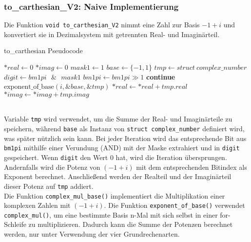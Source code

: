 \documentclass[course=erap]{aspdoc}
\begin{document}
\subsubsection{to\_carthesian\_V2: Naive Implementierung}
Die Funktion \texttt{void to\_carthesian\_V2} nimmt eine Zahl zur Basis $-1 + i$ und konvertiert sie in Dezimalsystem mit getrennten Real- und Imaginärteil.
\begin{algorithm}
\caption{to\_carthesian Pseudocode}
\begin{algorithmic}
    \State $*real \gets 0$
    \State $*imag \gets 0$
    \State $mask1 \gets 1$
    \State $base \gets \{-1, 1\}$
    \State $tmp \gets struct\ complex\_number$
        \State $digit \gets bm1pi \text{ } \&  \text{ }mask1$
        \State $bm1pi \gets bm1pi \gg 1$
            \State \textbf{continue}
        \EndIf
        \State $\text{exponent\_of\_base}(i, \&base, \&tmp)$
        \State $*real \gets *real + tmp.real$
        \State $*imag \gets *imag + tmp.imag$
    \EndFor
\end{algorithmic}
\end{algorithm}\\
Variable \texttt{tmp} wird verwendet, um die Summe der Real- und Imaginärteile zu speichern, während \texttt{base} als Instanz von \texttt{struct complex\_number} definiert wird, was später nützlich sein kann. Bei jeder Iteration wird das entsprechende Bit aus \texttt{bm1pi} mithilfe einer Verundung (AND) mit der Maske extrahiert und in \texttt{digit} gespeichert. Wenn \texttt{digit} den Wert 0 hat, wird die Iteration übersprungen. Andernfalls wird die Potenz von $(-1 + i)$ mit dem entsprechenden Bitindex als Exponent berechnet. %
Anschließend werden der Realteil und der Imaginärteil dieser Potenz auf \texttt{tmp} addiert.\\
 Die Funktion \texttt{complex\_mul\_base()} implementiert die Multiplikation einer komplexen Zahlen mit $(-1 + i)$. Die Funktion \texttt{exponent\_of\_base()} verwendet \texttt{complex\_mul()}, um eine bestimmte Basis n-Mal mit sich selbst in einer for-Schleife zu multiplizieren. Dadurch kann die Summe der Potenzen berechnet werden, nur unter Verwendung der vier Grundrechenarten.
\end{document}
